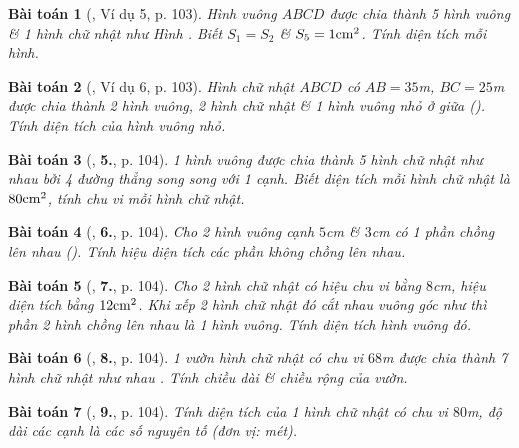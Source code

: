 \documentclass{article}
\numberwithin{equation}{section}
\newtheorem{baitoan}{Bài toán}[section]
\begin{document}
\begin{baitoan}[\cite{Binh_Toan_6_tap_1}, Ví dụ 5, p. 103]
	Hình vuông $ABCD$ được chia thành 5 hình vuông \& 1 hình chữ nhật như Hình \cite[Hình 24a, p. 103]{Binh_Toan_6_tap_1}. Biết $S_1 = S_2$ \& $S_5 = 1{\rm cm}^2$. Tính diện tích mỗi hình.
\end{baitoan}

\begin{baitoan}[\cite{Binh_Toan_6_tap_1}, Ví dụ 6, p. 103]
	Hình chữ nhật $ABCD$ có $AB = 35$\emph{m}, $BC = 25$\emph{m} được chia thành 2 hình vuông, 2 hình chữ nhật \& 1 hình vuông nhỏ ở giữa (\cite[Hình 25, p. 103]{Binh_Toan_6_tap_1}). Tính diện tích của hình vuông nhỏ.
\end{baitoan}

\begin{baitoan}[\cite{Binh_Toan_6_tap_1}, \textbf{5.}, p. 104]
	1 hình vuông được chia thành 5 hình chữ nhật như nhau bởi 4 đường thẳng song song với 1 cạnh. Biết diện tích mỗi hình chữ nhật là $80{\rm cm}^2$, tính chu vi mỗi hình chữ nhật.
\end{baitoan}

\begin{baitoan}[\cite{Binh_Toan_6_tap_1}, \textbf{6.}, p. 104]
	Cho 2 hình vuông cạnh $5$\emph{cm} \& $3$\emph{cm} có 1 phần chồng lên nhau (\cite[Hình 27, p. 104]{Binh_Toan_6_tap_1}). Tính hiệu diện tích các phần không chồng lên nhau.
\end{baitoan}

\begin{baitoan}[\cite{Binh_Toan_6_tap_1}, \textbf{7.}, p. 104]
	Cho 2 hình chữ nhật có hiệu chu vi bằng $8$\emph{cm}, hiệu diện tích bằng $12{\rm cm}^2$. Khi xếp 2 hình chữ nhật đó cắt nhau vuông góc như \cite[Hình 28, p. 104]{Binh_Toan_6_tap_1} thì phần 2 hình chồng lên nhau là 1 hình vuông. Tính diện tích hình vuông đó.
\end{baitoan}

\begin{baitoan}[\cite{Binh_Toan_6_tap_1}, \textbf{8.}, p. 104]
	1 vườn hình chữ nhật có chu vi $68$\emph{m} được chia thành 7 hình chữ nhật như nhau \cite[Hình 29, p. 104]{Binh_Toan_6_tap_1}. Tính chiều dài \& chiều rộng của vườn.
\end{baitoan}

\begin{baitoan}[\cite{Binh_Toan_6_tap_1}, \textbf{9.}, p. 104]
	Tính diện tích của 1 hình chữ nhật có chu vi $80$\emph{m}, độ dài các cạnh là các số nguyên tố (đơn vị: mét).
\end{baitoan}
\end{document}
